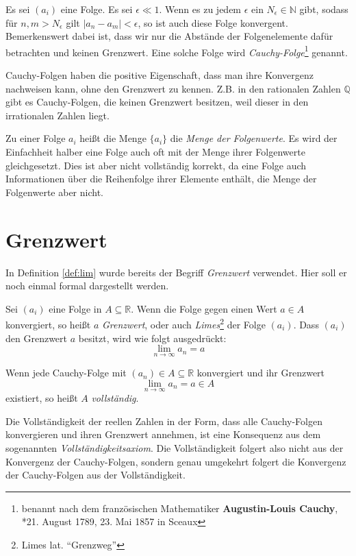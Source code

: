 \begin{definition}
Es sei $(a_i)$ eine Folge. Es sei $\epsilon \ll 1$. Wenn es zu jedem $\epsilon$ ein $N_\epsilon \in \mathbb{N}$ gibt, sodass für $n,m > N_\epsilon $ gilt $\vert a_n -a_m \vert <\epsilon$, so ist auch diese Folge konvergent. Bemerkenswert dabei ist, dass wir nur die Abstände der Folgenelemente dafür betrachten und keinen Grenzwert. Eine solche Folge wird \emph{Cauchy-Folge}\footnote{benannt nach dem französischen Mathematiker \textbf{Augustin-Louis Cauchy}, *21. August 1789, 23. Mai 1857 in Sceaux} genannt.
\end{definition}

Cauchy-Folgen haben die positive Eigenschaft, dass man ihre Konvergenz nachweisen kann, ohne den Grenzwert zu kennen. Z.B. in den rationalen Zahlen $\mathbb{Q}$ gibt es Cauchy-Folgen, die keinen Grenzwert besitzen, weil dieser in den irrationalen Zahlen liegt.


\begin{definition}
Zu einer Folge $a_i$ heißt die Menge $\lbrace a_i \rbrace$ die \emph{Menge der Folgenwerte}. Es wird der Einfachheit halber eine Folge auch oft mit der Menge ihrer Folgenwerte gleichgesetzt. Dies ist aber nicht vollständig korrekt, da eine Folge auch Informationen über die Reihenfolge ihrer Elemente enthält, die Menge der Folgenwerte aber nicht. 
\end{definition}

\section{Grenzwert}

In Definition \ref{def:lim} wurde bereits der Begriff \emph{Grenzwert} verwendet. Hier soll er noch einmal formal dargestellt werden. 

\begin{definition}
Sei $(a_i)$ eine Folge in $A\subseteq \mathbb{R}$. Wenn die Folge gegen einen Wert $a\in A$ konvergiert, so heißt $a$ \emph{Grenzwert}, oder auch \emph{Limes}\footnote{Limes lat. "`Grenzweg"'} der Folge $(a_i)$. Dass $(a_i)$ den Grenzwert $a$ besitzt, wird wie folgt ausgedrückt:
\[
\lim_{n\rightarrow \infty} a_n = a
\]
\end{definition}

\begin{definition}\label{def:voll}
Wenn jede Cauchy-Folge mit $(a_n)\in A\subseteq \mathbb{R}$ konvergiert und ihr Grenzwert 
\[\lim_{n\rightarrow \infty} a_n = a\in A\] 
existiert, so heißt $A$ \emph{vollständig}. 

Die Vollständigkeit der reellen Zahlen in der Form, dass alle Cauchy-Folgen konvergieren und ihren Grenzwert annehmen, ist eine Konsequenz aus dem sogenannten \emph{Vollständigkeitsaxiom}. Die Vollständigkeit folgert also nicht aus der Konvergenz der Cauchy-Folgen, sondern genau umgekehrt folgert die Konvergenz der Cauchy-Folgen aus der Vollständigkeit. 
\end{definition}


